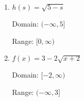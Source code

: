 \documentclass{ximera}
\begin{document}
\begin{enumerate}
 

 





\item  

$h(s) = \sqrt{5 - s}$ 

Domain: $(-\infty, 5]$ 

Range:  $[0, \infty)$






\item   

$f(x) = 3-2\sqrt{x+2}$ 

Domain: $[-2,\infty)$ 

Range: $(-\infty, 3]$ 


 

 






\end{enumerate}
\end{document}
